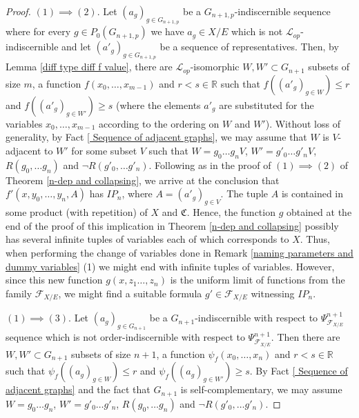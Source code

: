 \documentclass{amsart}
\newtheorem{external claim}[teor]{Claim}
\newcommand{\C}{{\mathfrak C}}
\newcommand{\mL}{\mathcal{L}}
\begin{document}
\begin{proof}
            $ (1)\implies (2)$. Let $(a_g)_{g\in G_{n+1,p}}$ be a $G_{n+1,p}$-indiscernible sequence where for every $g\in P_0(G_{n+1,p})$ we have $a_g\in X/E$ which is not $\mL_{op}$-indiscernible and let $(a'_g)_{g\in G_{n+1,p}}$ be a sequence of representatives. Then, by Lemma \ref{diff type diff f value}, there are $\mL_{op}$-isomorphic $W,W'\subset G_{n+1}$ subsets of size $m$, a function $f(x_0,\dots,x_{m-1})$ and $r<s\in \mathbb{R}$ such that $f( (a'_g)_{g\in W}) \leq r$ and $f( (a'_g)_{g\in W'})\geq s$ (where the elements $a'_g$ are substituted for the variables $x_0,\dots,x_{m-1}$ according to the ordering on $W$ and $W'$). Without loss of generality, by Fact \ref{ Sequence of adjacent graphs}, we may assume that $W$ is $V$-adjacent to $W'$ for some subset $V$ such that $W=g_0\dots g_n V$, $W'=g'_0\dots g'_n V$, $R(g_0,\dots g_n)$ and $\neg R(g'_0,\dots g'_n)$. 
            Following as in the proof of $(1) \implies (2)$ of Theorem \ref{n-dep and collapsing}, we arrive at the conclusion that $f'(x,y_0,\dots,y_n,A)$ has $IP_n$, where $A=(a'_g)_{g\in V}$. The tuple $A$ is contained in some product (with repetition) of $X$ and $\C$. Hence, the function $g$ obtained at the end of the proof of this implication in Theorem \ref{n-dep and collapsing} possibly has several infinite tuples of variables each of which corresponds to $X$. Thus, when performing the change of variables done in Remark \ref{naming parameters and dummy variables} (1) we might end with infinite tuples of variables. However, since this new function $g(x,z_1\dots,z_n)$ is the uniform limit of functions from the family $\mathcal{F}_{X/E}$, we might find a suitable formula $g'\in \mathcal{F}_{X/E}$ witnessing $IP_n$.
            
            $(1)\implies (3)$. %
            Let $(a_g)_{g\in G_{n+1}}$ be a $G_{n+1}$-indiscernible with respect to $\Psi^{n+1}_{\mathcal{F}_{X/E}}$ sequence which is not order-indiscernible with respect to $\Psi^{n+1}_{\mathcal{F}_{X/E}}$. Then there are $W,W'\subset G_{n+1}$ subsets of size $n+1$, a function $\psi_f(x_0,\dots,x_{n})$ and $r<s\in \mathbb{R}$ such that $\psi_f( (a_g)_{g\in W}) \leq r$ and $\psi_f( (a_g)_{g\in W'})\geq s$. By Fact \ref{ Sequence of adjacent graphs} and the fact that $G_{n+1}$ is self-complementary, %
            we may assume $W=g_0\dots g_n$, $W'=g'_0\dots g'_n$, $R(g_0,\dots g_n)$ and $\neg R(g'_0,\dots g'_n)$.


\end{proof}
\end{document}
